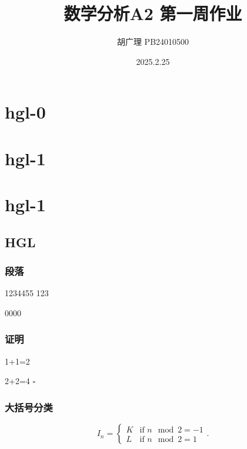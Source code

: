\documentclass{article}
\title{数学分析A2 第一周作业}
\author{胡广理 PB24010500}
\date{2025.2.25}
\newenvironment{proof}{{\noindent\it 证明}\quad}{\hfill $\square$\par}
\begin{document}
\maketitle


\tableofcontents


\section{hgl-0}


\section{hgl-1}   %


\section*{hgl-1}   %


\subsection{HGL}   %

\subsubsection{段落}   %
1234455   %
123

0000

\subsubsection{证明}

\begin{proof}  %

1+1=2

2+2=4
\end{proof}

\subsubsection{大括号分类}

\[   %
I_n = \begin{cases} 
K & \text{if } n \mod 2 = -1 \\
L & \text{if } n \mod 2 = 1 
\end{cases}.
\]
\end{document}
